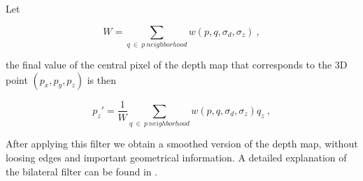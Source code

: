 Let 


$$ W = \sum\limits_{q\ \in\ p\ neighborhood} {w(p,q,\sigma_d,\sigma_z)}\ ,$$

\noindent the final value of the central pixel of the depth map that corresponds to the 3D point $(p_x,p_y,p_z)$ is then

$$p_z' = \frac{1}{W}\sum\limits_{q\ \in\ p\ neighborhood}{w(p,q,\sigma_d,\sigma_z)q_z}\ ,$$


After applying this filter we obtain a smoothed version of the depth map, without loosing edges and important geometrical information.
A detailed explanation of the bilateral filter can be found in \cite{TomasiBilateral}.

